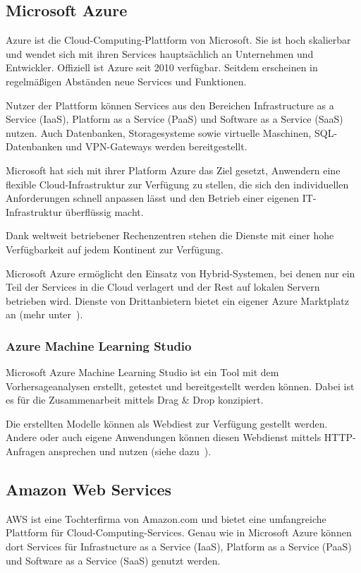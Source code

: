\subsection{Microsoft Azure}
Azure ist die Cloud-Computing-Plattform von Microsoft. Sie ist hoch skalierbar und wendet sich mit ihren Services
hauptsächlich an Unternehmen und Entwickler. Offiziell ist Azure seit 2010 verfügbar. Seitdem erscheinen in regelmäßigen
Abständen neue Services und Funktionen.

Nutzer der Plattform können Services aus den Bereichen Infrastructure as a Service (IaaS), Platform as a Service (PaaS)
und Software as a Service (SaaS) nutzen. Auch Datenbanken, Storagesysteme sowie virtuelle Maschinen, SQL-Datenbanken und
VPN-Gateways werden bereitgestellt.

Microsoft hat sich mit ihrer Platform Azure das Ziel gesetzt, Anwendern eine flexible Cloud-Infrastruktur zur Verfügung
zu stellen, die sich den individuellen Anforderungen schnell anpassen lässt und den Betrieb einer eigenen IT-Infrastruktur
überflüssig macht.

Dank weltweit betriebener Rechenzentren stehen die Dienste mit einer hohe Verfügbarkeit auf jedem Kontinent zur Verfügung.

Microsoft Azure ermöglicht den Einsatz von Hybrid-Systemen, bei denen nur ein Teil der Services in die Cloud verlagert
und der Rest auf lokalen Servern betrieben wird. Dienste von Drittanbietern bietet ein eigener Azure Marktplatz an
(mehr unter~\cite{online_grundlagen_azure}).

\subsubsection{Azure Machine Learning Studio}
Microsoft Azure Machine Learning Studio ist ein Tool mit dem Vorhersageanalysen erstellt, getestet und bereitgestellt
werden können. Dabei ist es für die Zusammenarbeit mittels Drag \& Drop konzipiert.

Die erstellten Modelle können als Webdiest zur Verfügung gestellt werden. Andere oder auch eigene Anwendungen können
diesen Webdienst mittels HTTP-Anfragen ansprechen und nutzen (siehe dazu~\cite{article_grundlagen_azure_studio}).

\subsection{Amazon Web Services}
AWS ist eine Tochterfirma von Amazon.com und bietet eine umfangreiche Plattform für Cloud-Computing-Services. Genau
wie in Microsoft Azure können dort Services für Infrastucture as a Service (IaaS), Platform as a Service (PaaS) und
Software as a Service (SaaS) genutzt werden.

